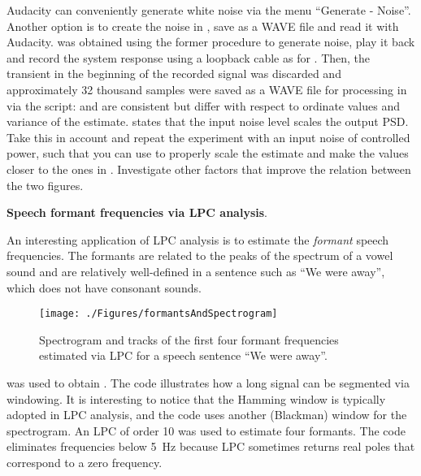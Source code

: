 Audacity can conveniently generate white noise via the menu ``Generate - Noise''. Another option is to create the noise in {\matlab}, save as a WAVE file and read it with Audacity.  was obtained using  the former procedure to generate noise, play it back and record the system response using a loopback cable as for . Then, the transient in the beginning of the recorded signal was discarded and approximately 32 thousand samples were saved as a WAVE file for processing in {\matlab} via the script:
 and  are consistent but differ with respect to ordinate values and variance of the estimate.  states that the input noise level scales the output PSD. Take this in account and repeat the experiment with an input noise of controlled power, such that you can use  to properly scale the estimate and make the values closer to the ones in . Investigate other factors that improve the relation between the two figures.
\eApplication

\bApplication \textbf{Speech formant frequencies via LPC analysis}.

An interesting application of LPC analysis is to estimate the \emph{formant} speech frequencies. The formants are  related to the peaks of the spectrum of a vowel sound and are relatively well-defined in a sentence such as ``We were away'', which does not have consonant sounds. 

\begin{figure}[htbp]
\centering
\texttt{[image: ./Figures/formantsAndSpectrogram]}
\caption{Spectrogram and tracks of the first four formant frequencies estimated via LPC for a speech sentence ``We were away''.\label{fig:formantsAndSpectrogram}}
\end{figure}

 was used to obtain .
The code illustrates how a long signal can be segmented via windowing. It is interesting to notice that the Hamming window is typically adopted in LPC analysis, and the code uses another (Blackman) window for the spectrogram.
An LPC of order 10 was used to estimate four formants. The code eliminates frequencies below 5~Hz because LPC sometimes returns real poles that correspond to a zero frequency.

